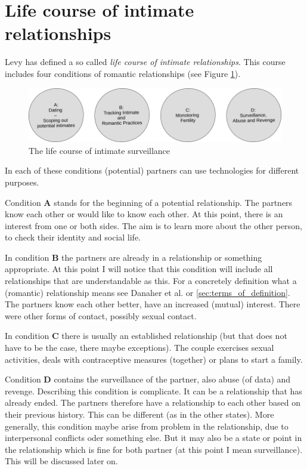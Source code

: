 \section{Life course of intimate relationships}

Levy \cite{levy2014intimate} has defined a so called \textit{life course of intimate relationships}. This course includes four conditions of romantic relationships (see Figure \ref{fig:live_course}).
\begin{figure}[htb]
    \centering
	\includegraphics[width=\linewidth]{img/life_course_of_intimate_surveillance.png}
	\caption{The life course of intimate surveillance}
	\label{fig:live_course}
\end{figure}

In each of these conditions (potential) partners can use technologies for different purposes.

Condition \textbf{A} stands for the beginning of a potential relationship. The partners know each other or would like to know each other. At this point, there is an interest from one or both sides. The aim is to learn more about the other person, to check their identity and social life.

In condition \textbf{B} the partners are already in a relationship or something appropriate. At this point I will notice that this condition will include all relationships that are understandable as this. For a concretely definition what a (romantic) relationship means see Danaher et al. \cite{doi:10.1080/15265161.2017.1409823} or \ref{sec:terms_of_definition}. The partners know each other better, have an increased (mutual) interest. There were other forms of contact, possibly sexual contact.

In condition \textbf{C} there is usually an established relationship (but that does not have to be the case, there maybe exceptions). The couple exercises sexual activities, deals with contraceptive measures (together) or plans to start a family.

Condition \textbf{D} contains the surveillance of the partner, also abuse (of data) and revenge. Describing this condition is complicate. 
It can be a relationship that has already ended. The partners therefore have a relationship to each other based on their previous history. This can be different (as in the other states). More generally, this condition maybe arise from problem in the relationship, due to interpersonal conflicts oder something else. But it may also be a state or point in the relationship which is fine for both partner (at this point I mean surveillance). This will be discussed later on.

